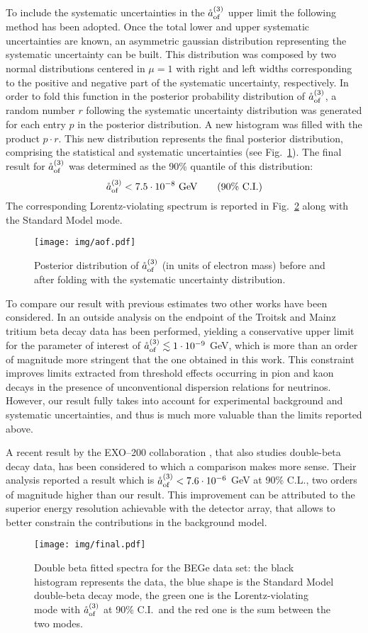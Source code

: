 To include the systematic uncertainties in the $\mathring{a}_\text{of}^{(3)}$ upper limit the following method has been adopted. Once the total lower and upper systematic uncertainties are known, an asymmetric gaussian distribution representing the systematic uncertainty can be built. This distribution was composed by two normal distributions centered in $\mu=1$ with right and left widths corresponding to the positive and negative part of the systematic uncertainty, respectively. In order to fold this function in the posterior probability distribution of $\mathring{a}_\text{of}^{(3)}$, a random number $r$ following the systematic uncertainty distribution was generated for each entry $p$ in the posterior distribution. A new histogram was filled with the product $p\cdot r$. This new distribution represents the final posterior distribution, comprising the statistical and systematic uncertainties (see Fig.~\ref{fig:aofpost}). The final result for $\mathring{a}_\text{of}^{(3)}$ was determined as the 90\% quantile of this distribution:
\begin{equation}\mathring{a}_\text{of}^{(3)}<7.5\cdot10^{-8}\ \text{GeV}\qquad(\text{90\% C.I.})\label{eq:aoffinal}\end{equation}
The corresponding Lorentz-violating spectrum is reported in Fig.~\ref{fig:final} along with the Standard Model mode.

\begin{figure}
	\centering
	\texttt{[image: img/aof.pdf]}
	\caption{Posterior distribution of $\mathring{a}_\text{of}^{(3)}$ (in units of electron mass) before and after folding with the systematic uncertainty distribution.}\label{fig:aofpost}
\end{figure}
 To compare our result with previous estimates two other works have been considered. In \cite{Diaz:2013saa} an outside analysis on the endpoint of the Troitsk and Mainz tritium beta decay data has been performed, yielding a conservative upper limit for the parameter of interest of $\mathring{a}_\text{of}^{(3)}\lesssim1\cdot10^{-9}$ GeV, which is more than an order of magnitude more stringent that the one obtained in this work. This constraint improves limits extracted from threshold effects occurring in pion and kaon decays in the presence of unconventional dispersion relations for neutrinos. However, our result fully takes into account for experimental background and systematic uncertainties, and thus is much more valuable than the limits reported above.

A recent result by the EXO--200 collaboration \cite{exo200}, that also studies double-beta decay data, has been considered to which a comparison makes more sense. Their analysis reported a result which is $\mathring{a}_\text{of}^{(3)}<7.6\cdot10^{-6}$ GeV at 90\% C.L., two orders of magnitude higher than our result. This improvement can be attributed to the superior energy resolution achievable with the {\gerda} detector array, that allows to better constrain the contributions in the background model.
\begin{figure}
	\centering
	\texttt{[image: img/final.pdf]}
	\caption{Double beta fitted spectra for the BEGe data set: the black histogram represents the data, the blue shape is the Standard Model double-beta decay mode, the green one is the Lorentz-violating mode with $\mathring{a}_\text{of}^{(3)}$ at 90\% C.I.~and the red one is the sum between the two modes.}\label{fig:final}
\end{figure}

